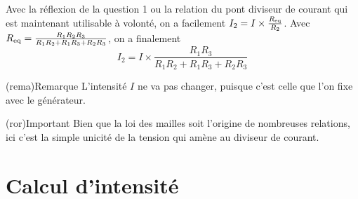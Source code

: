 \documentclass[../../main/main.tex]{subfiles}
\begin{document}
{\begin{tcbraster}[raster columns=7, raster equal height=rows]
\begin{tcb}[raster multicolumn=3]
        Avec la réflexion de la question 1 ou la relation du pont diviseur de
        courant qui est maintenant utilisable à volonté, on a facilement $I_2 =
        I\times \frac{R_{\rm eq}}{R_2}$. Avec $R_{\rm eq} =
        \frac{R_1R_2R_3}{R_1R_2+R_1R_3+R_2R_3}$, on a finalement
        \[\boxed{I_2 = I \times \frac{R_1R_3}{R_1R_2+R_1R_3+R_2R_3}}\]
    \end{tcb}
\end{tcbraster}
\begin{tcbraster}[raster columns=2, raster equal height=rows]
    \begin{tcb}(rema){Remarque}
        L'intensité $I$ ne va pas changer, puisque c'est celle que l'on fixe
        avec le générateur.
    \end{tcb}
    \begin{tcb}(ror){Important}
        Bien que la loi des mailles soit l'origine de nombreuses relations, ici
        c'est la simple unicité de la tension qui amène au diviseur de courant.
    \end{tcb}
\end{tcbraster}
}

\section{Calcul d'intensité}
\end{document}
